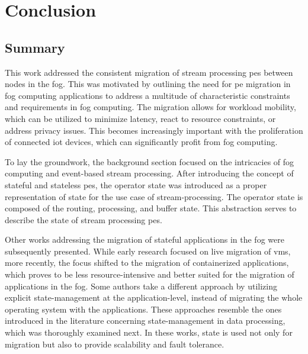 \section{Conclusion}
\label{lConclusion}

\subsection{Summary}
\label{lSummary}

This work addressed the consistent migration of stream processing \gls{pe}s between nodes in the fog. This was motivated by outlining the need for \gls{pe} migration in fog computing applications to address a multitude of characteristic constraints and requirements in fog computing. The migration allows for workload mobility, which can be utilized to minimize latency, react to resource constraints, or address privacy issues. This becomes increasingly important with the proliferation of connected \gls{iot} devices, which can significantly profit from fog computing.\par

To lay the groundwork, the background section focused on the intricacies of fog computing and event-based stream processing. After introducing the concept of stateful and stateless \gls{pe}s, the operator state was introduced as a proper representation of state for the use case of stream-processing. The operator state is composed of the routing, processing, and buffer state. This abstraction serves to describe the state of stream processing \gls{pe}s.\par

Other works addressing the migration of stateful applications in the fog were subsequently presented. While early research focused on live migration of \gls{vm}s, more recently, the focus shifted to the migration of containerized applications, which proves to be less resource-intensive and better suited for the migration of applications in the fog. Some authors take a different approach by utilizing explicit state-management at the application-level, instead of migrating the whole operating system with the applications. These approaches resemble the ones introduced in the literature concerning state-management in data processing, which was thoroughly examined next. In these works, state is used not only for migration but also to provide scalability and fault tolerance.\par

